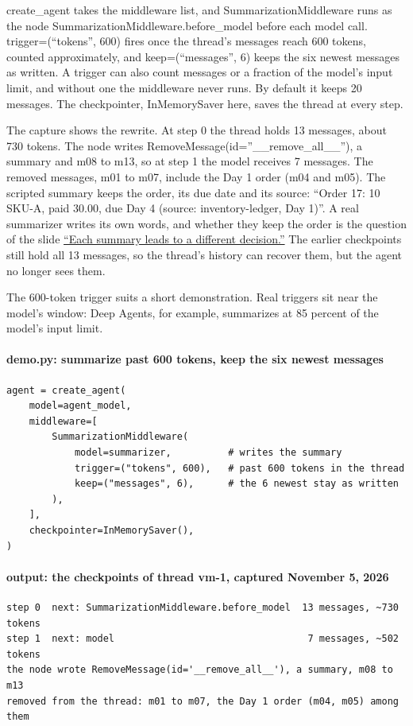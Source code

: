 create\_agent takes the middleware list, and SummarizationMiddleware runs as the node SummarizationMiddleware.before\_model before each model call. trigger=(``tokens'', 600) fires once the thread's messages reach 600 tokens, counted approximately, and keep=(``messages'', 6) keeps the six newest messages as written. A trigger can also count messages or a fraction of the model's input limit, and without one the middleware never runs. By default it keeps 20 messages. The checkpointer, InMemorySaver here, saves the thread at every step.

The capture shows the rewrite. At step 0 the thread holds 13 messages, about 730 tokens. The node writes RemoveMessage(id=''\_\_remove\_all\_\_''), a summary and m08 to m13, so at step 1 the model receives 7 messages. The removed messages, m01 to m07, include the Day 1 order (m04 and m05). The scripted summary keeps the order, its due date and its source: ``Order 17: 10 SKU-A, paid 30.00, due Day 4 (source: inventory-ledger, Day 1)''. A real summarizer writes its own words, and whether they keep the order is the question of the slide \hyperref[sec:it-9-3]{``Each summary leads to a different decision.''} The earlier checkpoints still hold all 13 messages, so the thread's history can recover them, but the agent no longer sees them.

The 600-token trigger suits a short demonstration. Real triggers sit near the model's window: Deep Agents, for example, summarizes at 85 percent of the model's input limit.

\paragraph{demo.py: summarize past 600 tokens, keep the six newest messages}
\begin{footnotesize}
\begin{verbatim}
agent = create_agent(
    model=agent_model,
    middleware=[
        SummarizationMiddleware(
            model=summarizer,          # writes the summary
            trigger=("tokens", 600),   # past 600 tokens in the thread
            keep=("messages", 6),      # the 6 newest stay as written
        ),
    ],
    checkpointer=InMemorySaver(),
)
\end{verbatim}
\end{footnotesize}

\paragraph{output: the checkpoints of thread vm-1, captured November 5, 2026}
\begin{footnotesize}
\begin{verbatim}
step 0  next: SummarizationMiddleware.before_model  13 messages, ~730 tokens
step 1  next: model                                  7 messages, ~502 tokens
the node wrote RemoveMessage(id='__remove_all__'), a summary, m08 to m13
removed from the thread: m01 to m07, the Day 1 order (m04, m05) among them
\end{verbatim}
\end{footnotesize}

